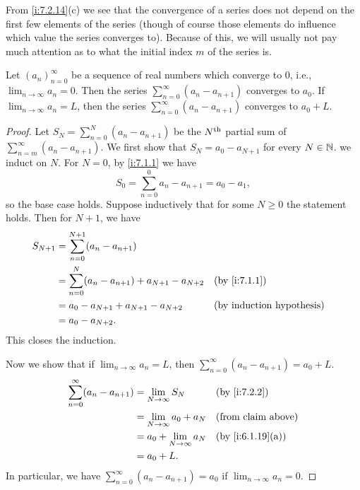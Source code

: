 \begin{note}
  From \cref{i:7.2.14}(c) we see that the convergence of a series does not depend on the first few elements of the series
  (though of course those elements do influence which value the series converges to).
  Because of this, we will usually not pay much attention as to what the initial index \(m\) of the series is.
\end{note}

\begin{lem}\label{i:7.2.15}
  Let \((a_n)_{n = 0}^\infty\) be a sequence of real numbers which converge to \(0\), i.e., \(\lim_{n \to \infty} a_n = 0\).
  Then the series \(\sum_{n = 0}^\infty (a_n - a_{n + 1})\) converges to \(a_0\).
  If \(\lim_{n \to \infty} a_n = L\), then the series \(\sum_{n = 0}^\infty (a_n - a_{n + 1})\) converges to \(a_0 + L\).
\end{lem}

\begin{proof}
  Let \(S_N = \sum_{n = 0}^N (a_n - a_{n + 1})\) be the \(N^{\operatorname{th}}\) partial sum of \(\sum_{n = m}^\infty (a_n - a_{n + 1})\).
  We first show that \(S_N = a_0 - a_{N + 1}\) for every \(N \in \mathbb{N}\).
  we induct on \(N\).
  For \(N = 0\), by \cref{i:7.1.1} we have
  \[
    S_0 = \sum_{n = 0}^0 a_n - a_{n + 1} = a_0 - a_1,
  \]
  so the base case holds.
  Suppose inductively that for some \(N \geq 0\) the statement holds.
  Then for \(N + 1\), we have
  \begin{align*}
    S_{N + 1} & = \sum_{n = 0}^{N + 1} (a_n - a_{n + 1})                                     \\
              & = \sum_{n = 0}^N (a_n - a_{n + 1}) + a_{N + 1} - a_{N + 2} &  & \by{i:7.1.1} \\
              & = a_0 - a_{N + 1} + a_{N + 1} - a_{N + 2}                  &  & \byIH        \\
              & = a_0 - a_{N + 2}.
  \end{align*}
  This closes the induction.

  Now we show that if \(\lim_{n \to \infty} a_n = L\), then \(\sum_{n = 0}^\infty (a_n - a_{n + 1}) = a_0 + L\).
  \begin{align*}
    \sum_{n = 0}^\infty (a_n - a_{n + 1}) & = \lim_{N \to \infty} S_N       &  & \by{i:7.2.2}              \\
                                          & = \lim_{N \to \infty} a_0 + a_N &  & \text{(from claim above)} \\
                                          & = a_0 + \lim_{N \to \infty} a_N &  & \by{i:6.1.19}[a]          \\
                                          & = a_0 + L.
  \end{align*}
  In particular, we have \(\sum_{n = 0}^\infty (a_n - a_{n + 1}) = a_0\) if \(\lim_{n \to \infty} a_n = 0\).
\end{proof}

